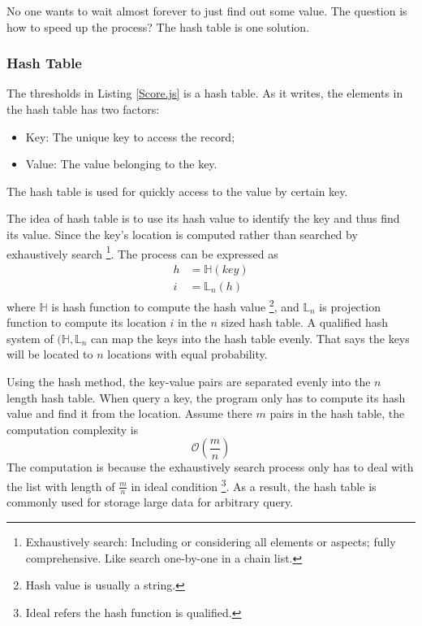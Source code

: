 No one wants to wait almost forever to just find out some value.
The question is how to speed up the process?
The hash table is one solution.

\subsubsection{Hash Table}

The thresholds in Listing \ref{Score.js} is a hash table.
As it writes, the elements in the hash table has two factors:
\begin{itemize}
    \item Key: The unique key to access the record;
    \item Value: The value belonging to the key.
\end{itemize}
The hash table is used for quickly access to the value by certain key.

The idea of hash table is to use its hash value to identify the key and thus find its value.
Since the key's location is computed rather than searched by exhaustively search
\footnote{
    Exhaustively search: Including or considering all elements or aspects; fully comprehensive.
    Like search one-by-one in a chain list.
}.
The process can be expressed as
\begin{align*}
    h & = \mathbb{H} (key) \\
    i & = \mathbb{L}_n (h)
\end{align*}
where $\mathbb{H}$ is hash function to compute the hash value
\footnote{
    Hash value is usually a string.
},
and $\mathbb{L}_n$ is projection function to compute its location $i$ in the $n$ sized hash table.
A qualified hash system of $(\mathbb{H}, \mathbb{L}_n$ can map the keys into the hash table evenly.
That says the keys will be located to $n$ locations with equal probability.

Using the hash method, the key-value pairs are separated evenly into the $n$ length hash table.
When query a key, the program only has to compute its hash value and find it from the location.
Assume there $m$ pairs in the hash table, the computation complexity is
\begin{equation}
    \label{Eq: cc-o2}
    \mathcal{O}(\frac{m}{n})
\end{equation}
The computation is because the exhaustively search process only has to deal with the list with length of $\frac{m}{n}$ in ideal condition
\footnote{
    Ideal refers the hash function is qualified.
}.
As a result, the hash table is commonly used for storage large data for arbitrary query.

